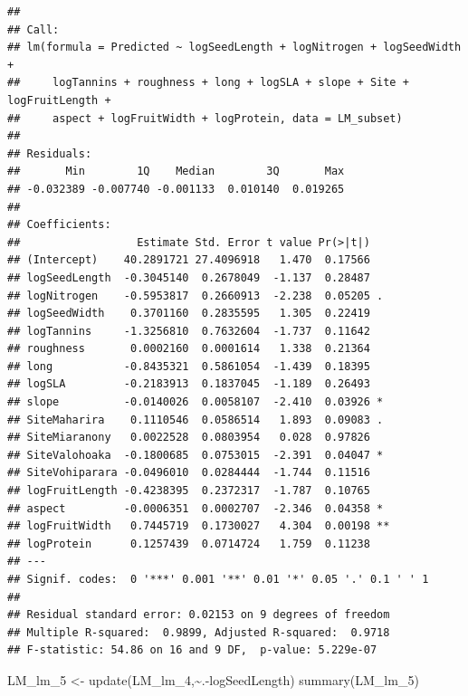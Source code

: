 \documentclass[
  12pt,
]{article}
\newenvironment{Shaded}{\begin{snugshade}}{\end{snugshade}}
\newcommand{\FunctionTok}[1]{\textcolor[rgb]{0.00,0.00,0.00}{#1}}
\newcommand{\NormalTok}[1]{#1}
\newcommand{\OtherTok}[1]{\textcolor[rgb]{0.56,0.35,0.01}{#1}}
\newcommand{\SpecialCharTok}[1]{\textcolor[rgb]{0.00,0.00,0.00}{#1}}
\begin{document}
\begin{verbatim}
## 
## Call:
## lm(formula = Predicted ~ logSeedLength + logNitrogen + logSeedWidth + 
##     logTannins + roughness + long + logSLA + slope + Site + logFruitLength + 
##     aspect + logFruitWidth + logProtein, data = LM_subset)
## 
## Residuals:
##       Min        1Q    Median        3Q       Max 
## -0.032389 -0.007740 -0.001133  0.010140  0.019265 
## 
## Coefficients:
##                  Estimate Std. Error t value Pr(>|t|)   
## (Intercept)    40.2891721 27.4096918   1.470  0.17566   
## logSeedLength  -0.3045140  0.2678049  -1.137  0.28487   
## logNitrogen    -0.5953817  0.2660913  -2.238  0.05205 . 
## logSeedWidth    0.3701160  0.2835595   1.305  0.22419   
## logTannins     -1.3256810  0.7632604  -1.737  0.11642   
## roughness       0.0002160  0.0001614   1.338  0.21364   
## long           -0.8435321  0.5861054  -1.439  0.18395   
## logSLA         -0.2183913  0.1837045  -1.189  0.26493   
## slope          -0.0140026  0.0058107  -2.410  0.03926 * 
## SiteMaharira    0.1110546  0.0586514   1.893  0.09083 . 
## SiteMiaranony   0.0022528  0.0803954   0.028  0.97826   
## SiteValohoaka  -0.1800685  0.0753015  -2.391  0.04047 * 
## SiteVohiparara -0.0496010  0.0284444  -1.744  0.11516   
## logFruitLength -0.4238395  0.2372317  -1.787  0.10765   
## aspect         -0.0006351  0.0002707  -2.346  0.04358 * 
## logFruitWidth   0.7445719  0.1730027   4.304  0.00198 **
## logProtein      0.1257439  0.0714724   1.759  0.11238   
## ---
## Signif. codes:  0 '***' 0.001 '**' 0.01 '*' 0.05 '.' 0.1 ' ' 1
## 
## Residual standard error: 0.02153 on 9 degrees of freedom
## Multiple R-squared:  0.9899, Adjusted R-squared:  0.9718 
## F-statistic: 54.86 on 16 and 9 DF,  p-value: 5.229e-07
\end{verbatim}

\begin{Shaded}
\begin{Highlighting}[]
\NormalTok{LM\_lm\_5 }\OtherTok{\textless{}{-}} \FunctionTok{update}\NormalTok{(LM\_lm\_4,}\SpecialCharTok{\textasciitilde{}}\NormalTok{.}\SpecialCharTok{{-}}\NormalTok{logSeedLength)}
\FunctionTok{summary}\NormalTok{(LM\_lm\_5)}
\end{Highlighting}
\end{Shaded}
\end{document}
